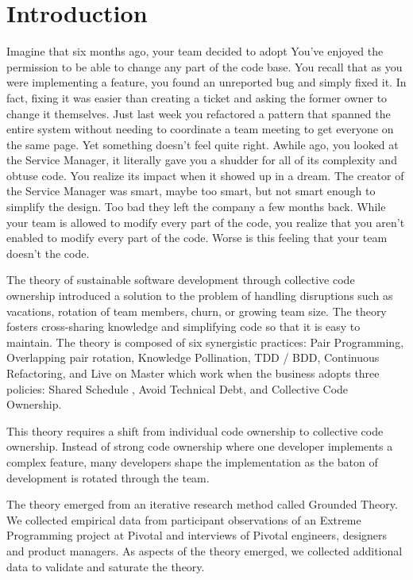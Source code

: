 \section{Introduction}
Imagine that six months ago, your team decided to adopt  You've enjoyed the permission to be able to change any part of the code base. You recall that as you were implementing a feature, you found an unreported bug and simply fixed it. In fact, fixing it was easier than creating a ticket and asking the former owner to change it themselves. Just last week you refactored a pattern that spanned the entire system without needing to coordinate a team meeting to get everyone on the same page. Yet something doesn't feel quite right. Awhile ago, you looked at the Service Manager, it literally gave you a shudder for all of its complexity and obtuse code. You realize its impact when it showed up in a dream. The creator of the Service Manager was smart, maybe too smart, but not smart enough to simplify the design. Too bad they left the company a few months back.  While your team is allowed to modify every part of the code, you realize that you aren't enabled to modify every part of the code. Worse is this feeling that your team doesn't  the code.

The theory of sustainable software development through collective code ownership \cite{SustainableSoftwareDevelopment} introduced a solution to the problem of handling disruptions such as vacations, rotation of team members, churn, or growing team size. The theory fosters cross-sharing knowledge and simplifying code so that it is easy to maintain. The theory is composed of six synergistic practices: Pair Programming, Overlapping pair rotation, Knowledge Pollination, TDD / BDD, Continuous Refactoring, and Live on Master which work when the business adopts three policies: Shared Schedule , Avoid Technical Debt, and Collective Code Ownership.

This theory requires a shift from individual code ownership to collective code ownership. Instead of strong code ownership where one developer implements a complex feature, many developers shape the implementation as the baton of development is rotated through the team. 

The theory emerged from an iterative research method called Grounded Theory. We collected empirical data from participant observations of an Extreme Programming project at Pivotal and interviews of Pivotal engineers, designers and product managers. As aspects of the theory emerged, we collected additional data to validate and saturate the theory.

